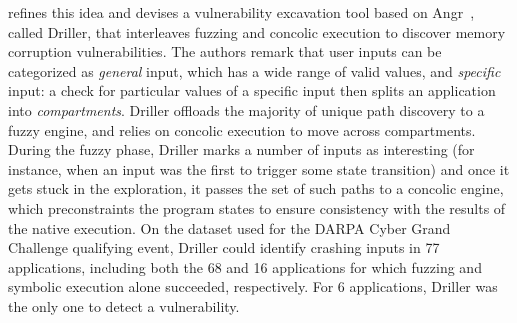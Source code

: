 \cite{DRILLER-NDSS16} refines this idea and devises a vulnerability excavation tool based on {\sc Angr}~\cite{ANGR-SSP16}, called Driller, that interleaves fuzzing and concolic execution to discover memory corruption vulnerabilities. The authors remark that user inputs can be categorized as {\em general} input, which has a wide range of valid values, and {\em specific} input: a check for particular values of a specific input then splits an application into {\em compartments}. Driller offloads the majority of unique path discovery to a fuzzy engine, and relies on concolic execution to move across compartments. During the fuzzy phase, Driller marks a number of inputs as interesting (for instance, when an input was the first to trigger some state transition) and once it gets stuck in the exploration, it passes the set of such paths to a concolic engine, which preconstraints the program states to ensure consistency with the results of the native execution. On the dataset used for the DARPA Cyber Grand Challenge qualifying event, Driller could identify crashing inputs in 77 applications, including both the 68 and 16 applications for which fuzzing and symbolic execution alone succeeded, respectively. For 6 applications, Driller was the only one to detect a vulnerability.

